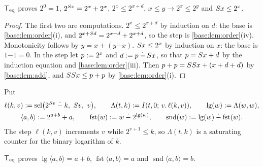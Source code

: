 \begin{lemma}
\label{base:lem:pow}
$\mathsf{T}_{\mathrm{eq}}$ proves $2^{0}=1$, $2^{S x}=2^{x}+2^{x}$, $2^{x}\le 2^{x+d}$,
$x\le y\to 2^{x}\le 2^{y}$ and $S x\le 2^{x}$.
\end{lemma}

\begin{proof}
The first two are computations.  $2^{x}\le 2^{x+d}$ by induction on $d$:
the base is \cref{base:lem:order}(i), and
$2^{x+S d}=2^{x+d}+2^{x+d}$, so the step is \cref{base:lem:order}(iv).
Monotonicity follows by $y=x+(y\mathbin{\dot-}x)$.  $S x\le 2^{x}$ by
induction on $x$: the base is $1\mathbin{\dot-}1=0$.  In the step let
$p\mathrel{:=} 2^{x}$ and $d\mathrel{:=} p\mathbin{\dot-}S x$, so that
$p=S x+d$ by the induction equation and \cref{base:lem:order}(iii).
Then $p+p=SS x+(x+d+d)$ by \cref{base:lem:add}, and
$SS x\le p+p$ by \cref{base:lem:order}(i).
\end{proof}

Put
\begin{gather*}
 \ell(k,v)\mathrel{:=}\operatorname{sel}\bigl(2^{S v}\mathbin{\dot-}k,\ S v,\ v\bigr),
 \qquad
 \Lambda(t,k)\mathrel{:=}I(t,0;\,v.\,\ell(k,v)),\qquad \lg(w)\mathrel{:=}\Lambda(w,w),\\
 \langle a,b\rangle\mathrel{:=} 2^{a+b}+a,\qquad
 \operatorname{fst}(w)\mathrel{:=} w\mathbin{\dot-}2^{\lg(w)},\qquad
 \operatorname{snd}(w)\mathrel{:=}\lg(w)\mathbin{\dot-}\operatorname{fst}(w).
\end{gather*}
The step $\ell(k,v)$ increments $v$ while $2^{v+1}\le k$, so $\Lambda(t,k)$
is a saturating counter for the binary logarithm of $k$.

\begin{theorem}[Pairing]
\label{base:thm:pair}
$\mathsf{T}_{\mathrm{eq}}$ proves $\lg\langle a,b\rangle=a+b$,
$\operatorname{fst}\langle a,b\rangle=a$ and
$\operatorname{snd}\langle a,b\rangle=b$.
\end{theorem}

